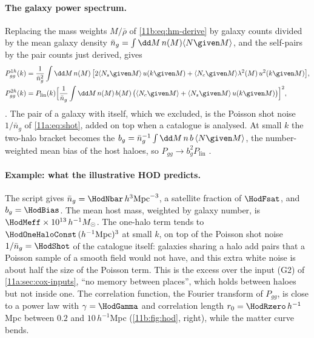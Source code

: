 \paragraph{The galaxy power spectrum.}
Replacing the mass weights $M/\bar\rho$ of \eqref{11b:eq:hm-derive} by galaxy
counts divided by the mean galaxy density
$\bar n_g=\int\dd M\,n(M)\langle N\given M\rangle$, and the self-pairs by the
pair counts just derived, gives
\begin{align}
  P_{gg}^{1h}(k)&=\frac{1}{\bar n_g^2}\int\dd M\,n(M)\,
     \bigl[2\langle N_s\given M\rangle\,u(k\given M)
     +\langle N_c\given M\rangle\lambda^2(M)\,u^2(k\given M)\bigr],\nonumber\\
  P_{gg}^{2h}(k)&=P_{\mathrm{lin}}(k)\Bigl[\frac{1}{\bar n_g}\int\dd M\,n(M)\,b(M)\,
     \bigl(\langle N_c\given M\rangle+\langle N_s\given M\rangle\,u(k\given M)\bigr)
     \Bigr]^2,
  \label{11b:eq:pgg}
\end{align}
. The pair of a galaxy with itself,
which we excluded, is the Poisson shot noise $1/\bar n_g$ of
\eqref{11a:eq:shot}, added on top when a catalogue is analysed. At small $k$ the
two-halo bracket becomes the 
$b_g=\bar n_g^{-1}\int\dd M\,n\,b\,\langle N\given M\rangle$, the number-weighted
mean bias of the host haloes, so $P_{gg}\to b_g^2P_{\mathrm{lin}}$
.

\paragraph{Example: what the illustrative HOD predicts.}
The script gives $\bar n_g=\HodNbar\,h^3\mathrm{Mpc}^{-3}$, a satellite fraction of
$\HodFsat$, and $b_g=\HodBias$. The mean host mass, weighted by galaxy number, is
$\HodMeff\times10^{13}\,h^{-1}M_\odot$. The one-halo term tends to
$\HodOneHaloConst\,(h^{-1}\mathrm{Mpc})^3$ at small $k$, on top of the Poisson shot
noise $1/\bar n_g=\HodShot$ of the catalogue itself: galaxies sharing a halo add
pairs that a Poisson sample of a smooth field would not have, and this extra white
noise is about half the size of the Poisson term. This is the excess over the input (G2) of
\cref{11a:sec:cox-inputs}, ``no memory between places'', which holds between haloes
but not inside one. The correlation function, the Fourier transform of $P_{gg}$,
is close to a power law with $\gamma=\HodGamma$ and correlation length
$r_0=\HodRzero\,h^{-1}$Mpc between $0.2$ and $10\,h^{-1}$Mpc
(\cref{11b:fig:hod}, right), while the matter curve bends.

